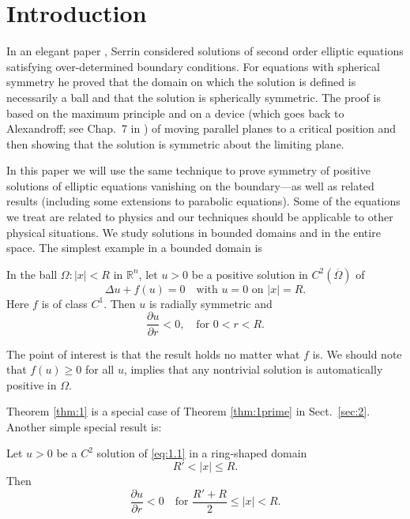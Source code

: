 \section{Introduction}\label{sec:1}

In an elegant paper \cite{serrin_symmetry_1971},
Serrin considered solutions of second order elliptic equations satisfying 
over-determined boundary conditions. For equations with spherical symmetry he proved that the 
domain on which the solution is defined is necessarily a ball and that the solution is spherically 
symmetric. The proof is based on the maximum principle and on a device (which goes back to 
Alexandroff; see Chap.~7 in \cite{hopf_differential_2003}) of moving parallel planes 
to a critical position and then showing 
that the solution is symmetric about the limiting plane.

In this paper we will use the same technique to prove symmetry of positive solutions of elliptic 
equations vanishing on the boundary---as well as related results (including some extensions to 
parabolic equations). Some of the equations we treat are related to physics and our techniques 
should be applicable to other physical situations. We study solutions in bounded domains and in 
the entire space. The simplest example in a bounded domain is

\begin{theorem}\label{thm:1}
  In the ball $\Omega: |x|<R$ in $\mathbb{R}^n$, let $u>0$ be a positive solution
  in $C^2(\overline{\Omega})$ of
  \begin{equation}\label{eq:1.1}
    \Delta u + f(u) = 0 \quad \text{with } u=0 \text{ on } |x|=R. 
  \end{equation}
  Here $f$ is of class $C^1$. Then $u$ is radially symmetric and
  \[\frac{\partial u}{\partial r} < 0,\quad \text{for } 0<r<R.\]
\end{theorem}

The point of interest is that the result holds no matter what $f$ is.
We should note that $f(u)\geq 0$ for all $u$,
implies that any nontrivial solution is automatically positive in $\Omega$.

Theorem \ref{thm:1} is a special case of Theorem \ref{thm:1prime} in Sect.~\ref{sec:2}.
Another simple special result is:

\begin{theorem}\label{thm:2}
  Let $u>0$ be a $C^2$ solution of \eqref{eq:1.1} in a ring-shaped domain
  \[R' < |x| \leq R.\]
  Then
  \begin{equation}
    \frac{\partial u}{\partial r} < 0 \quad \text{for } \frac{R'+R}{2}\leq |x| < R.
  \end{equation}
\end{theorem}

